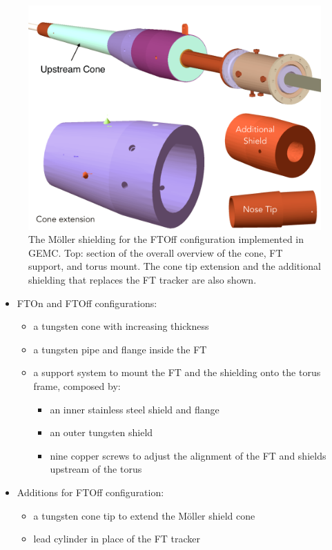 \begin{figure}
	\centering
	\includegraphics[width=0.99\columnwidth,keepaspectratio]{img/moellerShieldingFTOff.png}
   \caption{The M\"oller shielding for the FTOff configuration implemented in GEMC. Top: section of the overall overview of the cone, FT support, and torus mount.
            The cone tip extension and the additional shielding that replaces the FT tracker are also shown.}
	\label{fig:moellerShieldingFTOff}
\end{figure}



\begin{itemize}
	\item FTOn and FTOff configurations:
	\begin{itemize}
		\item a tungsten cone with increasing thickness
		\item a tungsten pipe and flange inside the FT
		\item a support system to mount the FT and the shielding onto the torus frame, composed by:
		\begin{itemize}
			\item an inner stainless steel shield and flange
			\item an outer tungsten shield
			\item nine copper screws to adjust the alignment of the FT and shields upstream of the torus
		\end{itemize}
	\end{itemize}
	\item Additions for FTOff configuration:
	\begin{itemize}
	\item a tungsten cone tip to extend the M\"oller shield cone
	\item lead cylinder in place of the FT tracker
	\end{itemize}

\end{itemize}




